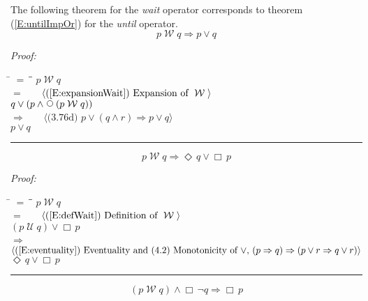 \documentclass[fleqn, leqno]{article}
\newcommand{\lgap}{2pt}                             %
\newcommand{\mymathindent}{24pt}                    %
\newcommand{\impl}{\ensuremath{\Rightarrow}}        %
\newcommand{\Until}{\;\mathcal{U}\;}
\newcommand{\Wait}{\;\mathcal{W}\;}
\newcommand{\Next}{\;\,\text{\raisebox{3.5pt}{\circle{6}}}}
\newcommand{\Event}{\Diamond\,}
\newcommand{\Always}{\Box\,}
\newcommand{\myqed}{\rule[-.23ex]{1.2ex}{2.0ex}}
\newcommand{\myqedtab}{\hspace{388.5pt}}              %
\newcommand{\Gll} {\langle}                         %
\newcommand{\Ggg} {\rangle}                         %
\newcommand{\Hint}[1]     {\ \ \ $\Gll              \mbox{#1} \Ggg$ }   %
\begin{document}
The following theorem for the \textit{wait} operator corresponds to theorem (\ref{E:untilImpOr}) for the \textit{until} operator.
\begin{equation}\label{E:waitToOr}
p \Wait q \impl p \lor q
\end{equation}

\emph{Proof:}
\begin{tabbing}
\hspace{\mymathindent} \= $= \;$ \= \myqedtab \= \kill
\> \> $p \Wait q$\\[\lgap]
\> $=$ \> \Hint{(\ref{E:expansionWait}) Expansion of $\Wait$} \\[\lgap]
\> \> $q \lor (p \land \Next(p \Wait q))$\\[\lgap]
\> $\impl$ \> \Hint{(3.76d) $p\lor (q\land r) \impl p\lor q$} \\[\lgap]
\> \> $p \lor q$ \> \myqed
\end{tabbing}

\begin{equation}\label{E:waitEntailment}
p \Wait q \impl \Event q \lor \Always p
\end{equation}

\emph{Proof:}
\begin{tabbing}
\hspace{\mymathindent} \= $= \;$ \= \myqedtab \= \kill
\> \> $p \Wait q$\\[\lgap]
\> $=$ \> \Hint{(\ref{E:defWait}) Definition of $\Wait$} \\[\lgap]
\> \> $(p \Until q) \lor \Always p$\\[\lgap]
\> $\impl$ \> \Hint{(\ref{E:eventuality}) Eventuality and (4.2) Monotonicity of $\lor$, $(p\impl q) \impl (p\lor r \impl q\lor r)$} \\[\lgap]
\> \> $\Event q \lor \Always p$ \> \myqed
\end{tabbing}

\begin{equation}\label{E:waitEntailAlways}
(p \Wait q) \land \Always\neg q \impl \Always p
\end{equation}
\end{document}
